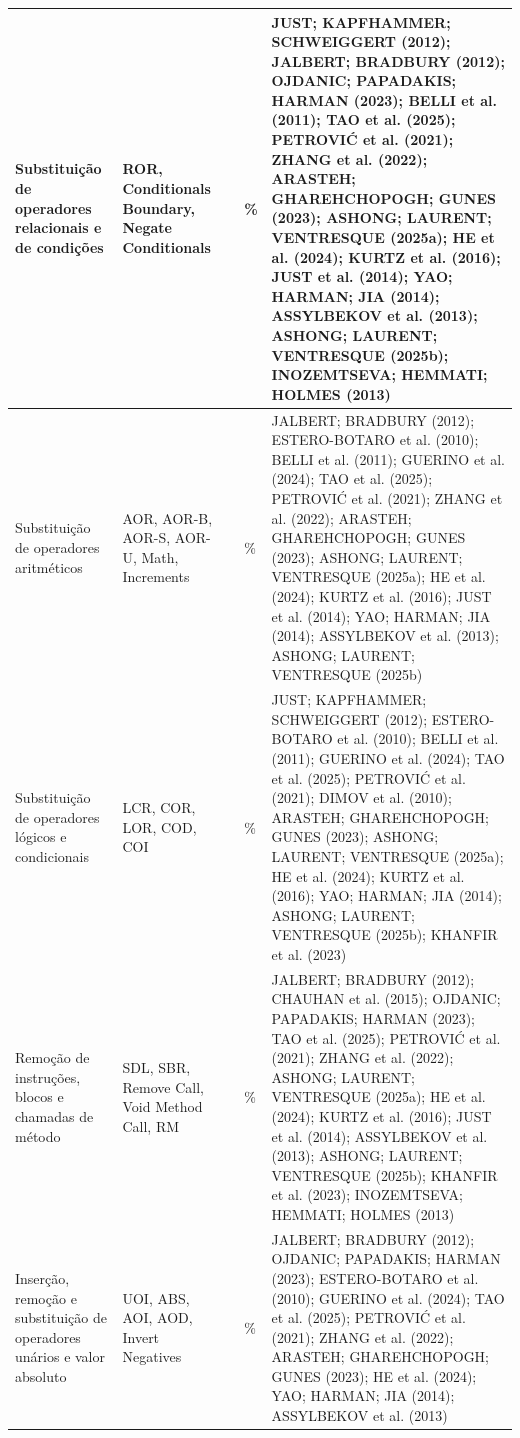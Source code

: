 \begin{longtable}{|p{}|p{}|>{\centering\arraybackslash}p{}|>{\centering\arraybackslash}p{}|p{}|}
    Substituição de operadores relacionais e de condições & ROR, Conditionals Boundary, Negate Conditionals & 16 & 44\% & JUST; KAPFHAMMER; SCHWEIGGERT (2012); JALBERT; BRADBURY (2012); OJDANIC; PAPADAKIS; HARMAN (2023); BELLI et al. (2011); TAO et al. (2025); PETROVIĆ et al. (2021); ZHANG et al. (2022); ARASTEH; GHAREHCHOPOGH; GUNES (2023); ASHONG; LAURENT; VENTRESQUE (2025a); HE et al. (2024); KURTZ et al. (2016); JUST et al. (2014); YAO; HARMAN; JIA (2014); ASSYLBEKOV et al. (2013); ASHONG; LAURENT; VENTRESQUE (2025b); INOZEMTSEVA; HEMMATI; HOLMES (2013) \\
    \hline
    Substituição de operadores aritméticos & AOR, AOR-B, AOR-S, AOR-U, Math, Increments & 15 & 42\% & JALBERT; BRADBURY (2012); ESTERO-BOTARO et al. (2010); BELLI et al. (2011); GUERINO et al. (2024); TAO et al. (2025); PETROVIĆ et al. (2021); ZHANG et al. (2022); ARASTEH; GHAREHCHOPOGH; GUNES (2023); ASHONG; LAURENT; VENTRESQUE (2025a); HE et al. (2024); KURTZ et al. (2016); JUST et al. (2014); YAO; HARMAN; JIA (2014); ASSYLBEKOV et al. (2013); ASHONG; LAURENT; VENTRESQUE (2025b) \\
    \hline
    Substituição de operadores lógicos e condicionais & LCR, COR, LOR, COD, COI & 14 & 39\% & JUST; KAPFHAMMER; SCHWEIGGERT (2012); ESTERO-BOTARO et al. (2010); BELLI et al. (2011); GUERINO et al. (2024); TAO et al. (2025); PETROVIĆ et al. (2021); DIMOV et al. (2010); ARASTEH; GHAREHCHOPOGH; GUNES (2023); ASHONG; LAURENT; VENTRESQUE (2025a); HE et al. (2024); KURTZ et al. (2016); YAO; HARMAN; JIA (2014); ASHONG; LAURENT; VENTRESQUE (2025b); KHANFIR et al. (2023) \\
    \hline
    Remoção de instruções, blocos e chamadas de método & SDL, SBR, Remove Call, Void Method Call, RM & 14 & 39\% & JALBERT; BRADBURY (2012); CHAUHAN et al. (2015); OJDANIC; PAPADAKIS; HARMAN (2023); TAO et al. (2025); PETROVIĆ et al. (2021); ZHANG et al. (2022); ASHONG; LAURENT; VENTRESQUE (2025a); HE et al. (2024); KURTZ et al. (2016); JUST et al. (2014); ASSYLBEKOV et al. (2013); ASHONG; LAURENT; VENTRESQUE (2025b); KHANFIR et al. (2023); INOZEMTSEVA; HEMMATI; HOLMES (2013) \\
    \hline
    Inserção, remoção e substituição de operadores unários e valor absoluto & UOI, ABS, AOI, AOD, Invert Negatives & 11 & 31\% & JALBERT; BRADBURY (2012); OJDANIC; PAPADAKIS; HARMAN (2023); ESTERO-BOTARO et al. (2010); GUERINO et al. (2024); TAO et al. (2025); PETROVIĆ et al. (2021); ZHANG et al. (2022); ARASTEH; GHAREHCHOPOGH; GUNES (2023); HE et al. (2024); YAO; HARMAN; JIA (2014); ASSYLBEKOV et al. (2013) \\

\end{longtable}
